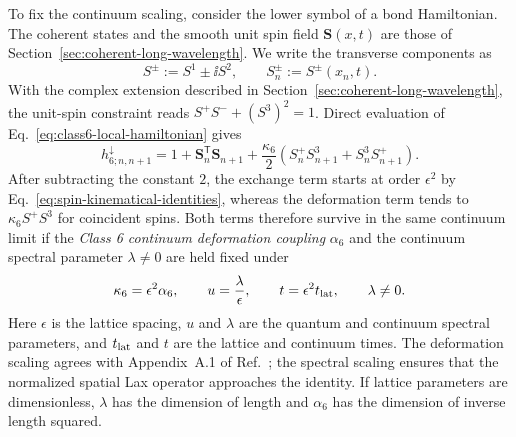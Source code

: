 To fix the continuum scaling, consider the lower symbol of a bond
Hamiltonian.  The coherent states and the smooth unit spin field
$\boldsymbol S(x,t)$ are those of Section~\ref{sec:coherent-long-wavelength}.
We write the transverse components as
\begin{equation}
S^{\pm}:=S^1\pm\ii S^2,
\qquad S_n^{\pm}:=S^{\pm}(x_n,t).
\label{eq:class6-spin-pm}
\end{equation}
With the complex extension described in
Section~\ref{sec:coherent-long-wavelength}, the unit-spin constraint reads
$S^+S^-+(S^3)^2=1$.
Direct evaluation of Eq.~\eqref{eq:class6-local-hamiltonian} gives
\begin{equation}
h_{6;n,n+1}^{\downarrow}
=1+\boldsymbol S_n^{\mathsf T}\boldsymbol S_{n+1}
+\frac{\kappa_6}{2}
\left(S_n^+S_{n+1}^3+S_n^3S_{n+1}^+\right).
\label{eq:class6-bond-lower-symbol}
\end{equation}
After subtracting the constant $2$, the exchange term starts at order
$\epsilon^2$ by Eq.~\eqref{eq:spin-kinematical-identities}, whereas the
deformation term tends to $\kappa_6 S^+S^3$ for coincident spins.  Both
terms therefore survive in the same continuum limit if the
\emph{Class 6 continuum deformation coupling} $\alpha_6$ and the
continuum spectral parameter $\lambda\neq0$ are held fixed under
\begin{equation}
\kappa_6=\epsilon^2\alpha_6,
\qquad
u=\frac{\lambda}{\epsilon},
\qquad
t=\epsilon^2t_{\rm lat},
\qquad \lambda\neq0.
\label{eq:class6-continuum-scaling}
\end{equation}
Here $\epsilon$ is the lattice spacing, $u$ and $\lambda$ are the quantum
and continuum spectral parameters, and $t_{\rm lat}$ and $t$ are the
lattice and continuum times.  The deformation scaling agrees with
Appendix~A.1 of Ref.~\cite{deLeeuwFontanellaNietoGarcia2026}; the spectral
scaling ensures that the normalized spatial Lax operator approaches the
identity.  If lattice parameters are dimensionless, $\lambda$ has the
dimension of length and $\alpha_6$ has the dimension of inverse length
squared.

